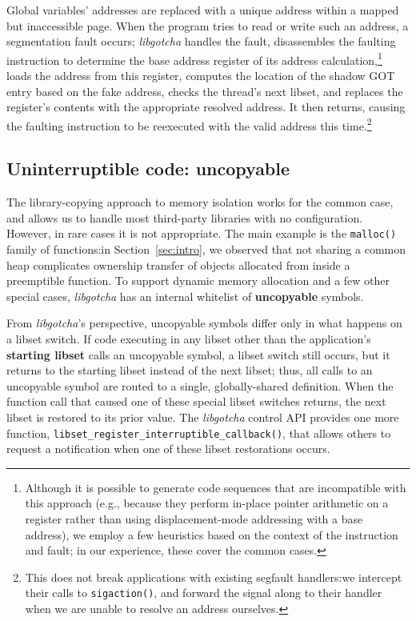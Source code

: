 
Global variables' addresses are replaced with a unique address within a mapped but
inaccessible page.  When the program tries to read or write such an address, a
segmentation fault occurs; \textit{libgotcha} handles the fault, disassembles the
faulting instruction to determine the base address register of its address
calculation,\footnote{Although it is possible to
generate code sequences that are incompatible with this approach (e.g., because they
perform in-place pointer arithmetic on a register rather than using displacement-mode
addressing with a base address), we employ a few heuristics based on the context of
the instruction and fault; in our experience, these cover the common cases.}
loads the address from this register, computes the location of the
shadow GOT entry based on the fake address, checks the thread's next libset, and
replaces the register's contents with the appropriate resolved address.  It then
returns, causing the faulting instruction to be reexecuted with the valid address
this time.\footnote{This does not break applications with existing segfault
handlers:\@ we intercept their calls to \texttt{sigaction()}, and forward the signal
along to their handler when we are unable to resolve an address ourselves.}



\subsection{Uninterruptible code: uncopyable}
\label{sec:uncopyable}

The library-copying approach to memory isolation works for the common case, and
allows us to handle most third-party libraries with no configuration.  However, in
rare cases it is not appropriate.  The main example is the \texttt{malloc()} family
of functions:\@ in Section~\ref{sec:intro}, we observed that not sharing a common
heap complicates ownership transfer of objects allocated from inside a preemptible
function.  To support dynamic memory allocation and a few other special cases,
\textit{libgotcha} has an internal whitelist of \textbf{uncopyable} symbols.

From \textit{libgotcha}'s perspective, uncopyable symbols differ only in what
happens on a libset switch.  If code executing in any libset other than the
application's \textbf{starting libset} calls an uncopyable symbol, a libset
switch still occurs, but it returns to the starting libset instead of the next
libset; thus, all calls to an uncopyable symbol are routed to a single,
globally-shared definition.  When the function call that caused one of these special
libset switches returns, the next libset is restored to its prior value.  The
\textit{libgotcha} control API provides one more function,
\texttt{libset\_register\_interruptible\_callback()}, that allows others to request
a notification when one of these libset restorations occurs.

